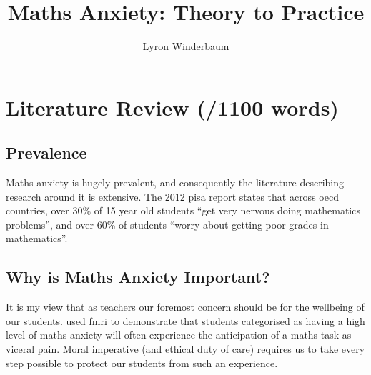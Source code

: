 \documentclass[14pt]{memoir}
\title{Maths Anxiety: Theory to Practice}
\author{Lyron Winderbaum}
\begin{document}
\maketitle



\begin{abstract}

\lipsum[1-2]

\end{abstract}


\glsresetall
\section*{Literature Review (/1100 words)}

\subsection*{Prevalence}

Maths anxiety is hugely prevalent, and consequently the literature describing research around it is extensive. The  2012 \gls{pisa} report states that across \gls{oecd} countries, over 30\% of 15 year old students ``get very nervous doing mathematics problems'', and over 60\% of students ``worry about getting poor grades in mathematics''. 

\subsection*{Why is Maths Anxiety Important?}

It is my view that as teachers our foremost concern should be for the wellbeing of our students.  used \gls{fmri} to demonstrate that students categorised as having a high level of maths anxiety will often experience the anticipation of a maths task as viceral pain. Moral imperative (and ethical duty of care) requires us to take every step possible to protect our students from such an experience.
\end{document}
